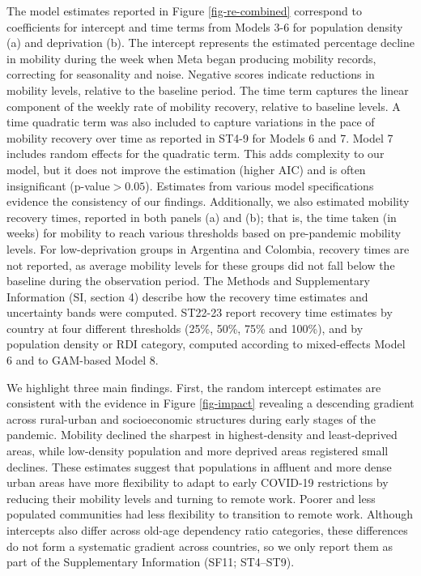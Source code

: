 \documentclass[fleqn,10pt]{wlscirep}
\begin{document}
The model estimates reported in Figure \ref{fig-re-combined} correspond to coefficients for intercept and time terms from Models 3-6 for population density (a) and deprivation (b). The intercept represents the estimated percentage decline in mobility during the week when Meta began producing mobility records, correcting for seasonality and noise. Negative scores indicate reductions in mobility levels, relative to the baseline period. The time term captures the linear component of the weekly rate of mobility recovery, relative to baseline levels. A time quadratic term was also included to capture variations in the pace of mobility recovery over time as reported in ST4-9 for Models 6 and 7. Model 7 includes random effects for the quadratic term. This adds complexity to our model, but it does not improve the estimation (higher AIC) and is often insignificant (p-value$>0.05$). Estimates from various model specifications evidence the consistency of our findings. Additionally, we also estimated mobility recovery times, reported in both panels (a) and (b); that is, the time taken (in weeks) for mobility to reach various thresholds based on pre-pandemic mobility levels. For low-deprivation groups in Argentina and Colombia, recovery times are not reported, as average mobility levels for these groups did not fall below the baseline during the observation period. The Methods and Supplementary Information (SI, section 4) describe how the recovery time estimates and uncertainty bands were computed. ST22-23 report recovery time estimates by country at four different thresholds (25\%, 50\%, 75\% and 100\%), and by population density or RDI category, computed according to mixed-effects Model 6 and to GAM-based Model 8. 

We highlight three main findings. First, the random intercept estimates are consistent with the evidence in Figure \ref{fig-impact} revealing a descending gradient across rural-urban and socioeconomic structures during early stages of the pandemic. Mobility declined the sharpest in highest-density and least-deprived areas, while low-density population and more deprived areas registered small declines. These estimates suggest that populations in affluent and more dense urban areas have more flexibility to adapt to early COVID-19 restrictions by reducing their mobility levels and turning to remote work. Poorer and less populated communities had less flexibility to transition to remote work. Although intercepts also differ across old-age dependency ratio categories, these differences do not form a systematic gradient across countries, so we only report them as part of the Supplementary Information (SF11; ST4–ST9).
\end{document}
